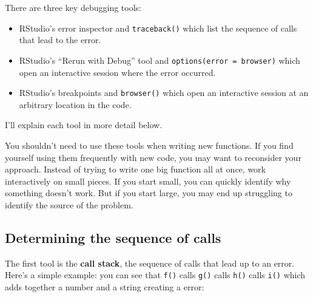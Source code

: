 There are three key debugging tools:

\begin{itemize}
\item
  RStudio's error inspector and \texttt{traceback()} which list the
  sequence of calls that lead to the error.
\item
  RStudio's ``Rerun with Debug'' tool and
  \texttt{options(error\ =\ browser)} which open an interactive session
  where the error occurred.
\item
  RStudio's breakpoints and \texttt{browser()} which open an interactive
  session at an arbitrary location in the code.
\end{itemize}

I'll explain each tool in more detail below.

You shouldn't need to use these tools when writing new functions. If you
find yourself using them frequently with new code, you may want to
reconsider your approach. Instead of trying to write one big function
all at once, work interactively on small pieces. If you start small, you
can quickly identify why something doesn't work. But if you start large,
you may end up struggling to identify the source of the problem.

\hypertarget{determining-the-sequence-of-calls}{%
\subsection{Determining the sequence of
calls}\label{determining-the-sequence-of-calls}}

The first tool is the \textbf{call stack}, the sequence of calls that
lead up to an error. Here's a simple example: you can see that
\texttt{f()} calls \texttt{g()} calls \texttt{h()} calls \texttt{i()}
which adds together a number and a string creating a error:
 

\begin{Shaded}
\begin{Highlighting}[]
\StringTok{ }
\StringTok{ }
\StringTok{ }
\StringTok{ } \OperatorTok{+}\StringTok{ }
\NormalTok{(}\NormalTok{)}
\end{Highlighting}
\end{Shaded}

